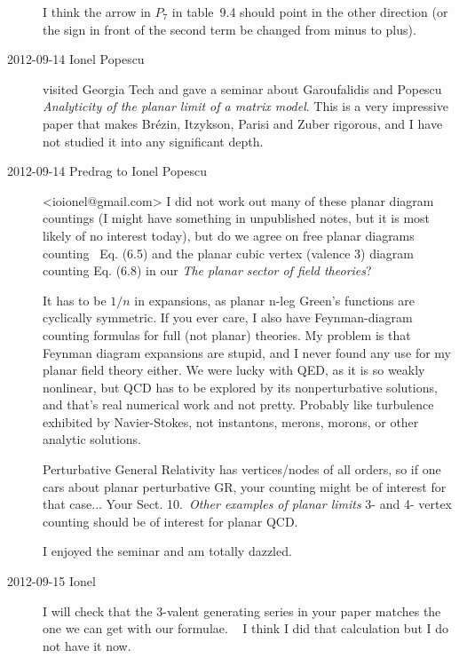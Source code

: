\begin{description}
I think the arrow in $P_7$ in table~9.4 should point in the other direction
(or the sign in front of the second term be changed from minus to plus).

\item[2012-09-14 Ionel Popescu] visited Georgia Tech and gave a seminar
about Garoufalidis and Popescu {\em Analyticity of the
planar limit of a matrix model}. This is a very impressive paper that
makes Br{\'{e}}zin, Itzykson, Parisi and Zuber rigorous, and I
have not studied it into any significant depth.

\item[2012-09-14 Predrag to Ionel Popescu] <ioionel@gmail.com>
I did not work out many of these planar diagram countings (I might have
something in unpublished notes, but it is most likely of no interest
today), but do we agree on free planar diagrams counting  Eq. (6.5) and the
planar cubic vertex (valence 3) diagram counting Eq. (6.8)
in our 
{{\em The planar sector of field theories}}?

It has to be $1/n$ in expansions, as planar n-leg Green's functions are
cyclically symmetric. If you ever care, I also have Feynman-diagram
counting formulas for full (not planar) theories. My problem is that Feynman
diagram expansions are
{stupid},
and I never found any use for my planar field
theory
{either}.
We were lucky with QED, as it is so weakly nonlinear, but QCD has
to be explored by its nonperturbative solutions, and that's real numerical
work and not pretty. Probably like turbulence exhibited by Navier-Stokes,
not instantons, merons, morons, or other analytic solutions.

Perturbative General Relativity has vertices/nodes of all orders, so if one
cars about planar perturbative GR, your counting might be of interest for
that case... Your Sect. 10.~{\em Other examples of planar limits} 3- and 4-
vertex counting should be of interest for planar QCD.

I enjoyed the seminar and am totally dazzled.

\item[2012-09-15 Ionel]
I will check that the 3-valent generating series in your paper matches
the one we can get with our formulae.   I think I did that calculation
but I do not have it now.


\end{description}
